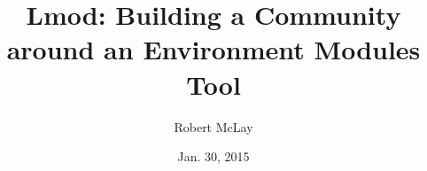 \documentclass{beamer}
\title{Lmod: Building a Community around an Environment Modules Tool}
\author{Robert McLay}
\institute{The Texas Advanced Computing Center}
\date{Jan. 30, 2015}  %
\begin{document}
\begin{frame}
  \titlepage
\end{frame}


% 
%  
%  
\end{document}
